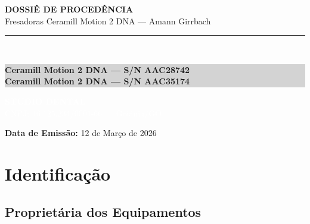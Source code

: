\documentclass[12pt, a4paper]{article}
\begin{document}
\begin{titlepage}
    \centering
    \vspace*{3cm}
    {\Huge \textbf{\textcolor{primaryColor}{DOSSIÊ DE PROCEDÊNCIA}}} \\
    \vspace{0.8cm}
    {\large Fresadoras Ceramill Motion 2 DNA --- Amann Girrbach} \\
    \vspace{2.5cm}
    \rule{10cm}{1.5pt} \\
    \vspace{0.8cm}
    \colorbox{lightGray}{%
        \parbox{0.85\textwidth}{%
            \centering
            \vspace{0.5cm}
            {\large \textbf{Ceramill Motion 2 DNA --- S/N AAC28742}} \\
            \vspace{0.2cm}
            {\large \textbf{Ceramill Motion 2 DNA --- S/N AAC35174}} \\
            \vspace{0.5cm}
        }%
    }

    \vfill

    \colorbox{accentColor}{%
        \parbox{0.85\textwidth}{%
            \centering
            \vspace{0.5cm}
            \textcolor{white}{\Large \textbf{STUDIO DENTAL}} \\
            \vspace{0.2cm}
            \textcolor{white}{\normalsize CNPJ: 46.125.234/0001-66 --- Goiânia/GO} \\
            \vspace{0.5cm}
        }%
    }

    \vspace{0.5cm}
    \textbf{Data de Emissão:} 12 de Março de 2026
\end{titlepage}

\section{Identificação}

\subsection{Proprietária dos Equipamentos}
\end{document}
